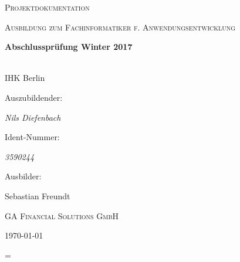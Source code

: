 \documentclass[fontsize=12pt,paper=a4,draft=off,titlepage=off]{scrartcl}
\begin{document}
\pagestyle{fancy}


\begin{titlepage}
    \centering
    {\scshape\LARGE Projektdokumentation\par}
    \vspace{1cm}
    {\scshape\Large Ausbildung zum Fachinformatiker f. Anwendungsentwicklung\par}
    \vspace{1.5cm}
    {\huge\bfseries Abschlussprüfung Winter 2017\par\\IHK Berlin\par}
    \vspace{2cm}
    Auszubildender:\par
    {\Large\itshape Nils Diefenbach\par}
    Ident-Nummer:\par
    {\Large\itshape 3590244\par}
    \vfill
    Ausbilder:\par
    Sebastian Freundt\par \textsc{GA Financial Solutions GmbH}
    \vfill
    {\large \today\par}
\end{titlepage}
\clearpage

\tableofcontents{}
\clearpage


\clearpage


\clearpage


\clearpage


\clearpage


\clearpage


\clearpage


\clearpage

=
\clearpage


\clearpage




\end{document}
